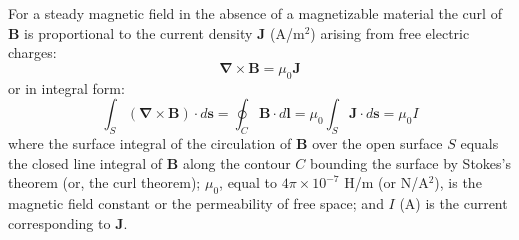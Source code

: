For a steady magnetic field in the absence of a magnetizable material the curl of $\mathbf{B}$ is proportional to the current density $\mathbf{J}$ (A/m$^2$) arising from free electric charges:
\begin{equation}\label{curl B}
\mathbf{\nabla} \times \mathbf{B} = \mu_0 \mathbf{J}
\end{equation}
or in integral form:
\begin{equation}\label{int B.dl}
\int_S (\mathbf{\nabla} \times \mathbf{B}) \cdot d\mathbf{s} = \oint_C \mathbf{B} \cdot d\mathbf{l} =  \mu_0 \int_S \mathbf{J} \cdot d\mathbf{s} = \mu_0 I
\end{equation}
{\noindent}where the surface integral of the circulation of $\mathbf{B}$ over the open surface $S$ equals the closed line integral of $\mathbf{B}$ along the contour $C$ bounding the surface by Stokes's theorem (or, the curl theorem); $\mu_0$, equal to $4 \pi \times 10^{-7}$ H/m (or N/A$^2$), is the magnetic field constant or the permeability of free space; and $I$ (A) is the current corresponding to $\mathbf{J}$.\\

